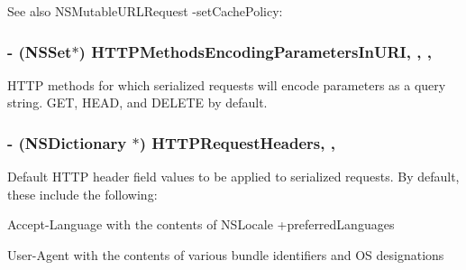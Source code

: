 \begin{DoxySeeAlso}{See also}
N\+S\+Mutable\+U\+R\+L\+Request -\/set\+Cache\+Policy\+: 
\end{DoxySeeAlso}
\hypertarget{interface_a_f_h_t_t_p_request_serializer_abc3b1a3688cdc0006389b04c83fa11c2}{}
\subsubsection[{H\+T\+T\+P\+Methods\+Encoding\+Parameters\+In\+U\+R\+I}]{\setlength{\rightskip}{0pt plus 5cm}-\/ (N\+S\+Set$\ast$) H\+T\+T\+P\+Methods\+Encoding\+Parameters\+In\+U\+R\+I\hspace{0.3cm}{\ttfamily [read]}, {\ttfamily [write]}, {\ttfamily [nonatomic]}, {\ttfamily [strong]}}\label{interface_a_f_h_t_t_p_request_serializer_abc3b1a3688cdc0006389b04c83fa11c2}
H\+T\+T\+P methods for which serialized requests will encode parameters as a query string. {\ttfamily G\+E\+T}, {\ttfamily H\+E\+A\+D}, and {\ttfamily D\+E\+L\+E\+T\+E} by default. \hypertarget{interface_a_f_h_t_t_p_request_serializer_a8ea98a933795e97a771f4b5a82a637c2}{}
\subsubsection[{H\+T\+T\+P\+Request\+Headers}]{\setlength{\rightskip}{0pt plus 5cm}-\/ (N\+S\+Dictionary $\ast$) H\+T\+T\+P\+Request\+Headers\hspace{0.3cm}{\ttfamily [read]}, {\ttfamily [nonatomic]}, {\ttfamily [strong]}}\label{interface_a_f_h_t_t_p_request_serializer_a8ea98a933795e97a771f4b5a82a637c2}
Default H\+T\+T\+P header field values to be applied to serialized requests. By default, these include the following\+:


\begin{DoxyItemize}
\item {\ttfamily Accept-\/\+Language} with the contents of {\ttfamily N\+S\+Locale +preferred\+Languages}
\item {\ttfamily User-\/\+Agent} with the contents of various bundle identifiers and O\+S designations
\end{DoxyItemize}

